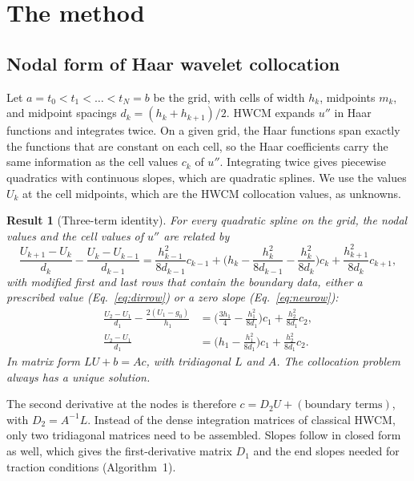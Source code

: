 \documentclass[preprint,12pt]{elsarticle}
\newtheorem{result}{Result}
\theoremstyle{remark}
\begin{document}
\section{The method}\label{sec:method}
\subsection{Nodal form of Haar wavelet collocation}
Let $a=t_0<t_1<\dots<t_N=b$ be the grid, with cells of width $h_k$, midpoints $m_k$, and midpoint
spacings $d_k=(h_k+h_{k+1})/2$. HWCM expands $u''$ in Haar functions and integrates twice. On a given
grid, the Haar functions span exactly the functions that are constant on each cell, so the Haar
coefficients carry the same information as the cell values $c_k$ of $u''$. Integrating twice gives
piecewise quadratics with continuous slopes, which are quadratic splines. We use the values $U_k$ at the
cell midpoints, which are the HWCM collocation values, as unknowns.

\begin{result}[Three-term identity]\label{thm:identity}
For every quadratic spline on the grid, the nodal values and the cell values of $u''$ are related by
\begin{equation}\label{eq:interior}
\frac{U_{k+1}-U_k}{d_k}-\frac{U_k-U_{k-1}}{d_{k-1}}
=\frac{h_{k-1}^2}{8d_{k-1}}c_{k-1}+\Big(h_k-\frac{h_k^2}{8d_{k-1}}-\frac{h_k^2}{8d_k}\Big)c_k+\frac{h_{k+1}^2}{8d_k}c_{k+1},
\end{equation}
with modified first and last rows that contain the boundary data, either a prescribed value
(Eq.~\eqref{eq:dirrow}) or a zero slope (Eq.~\eqref{eq:neurow}):
\begin{align}
\frac{U_2-U_1}{d_1}-\frac{2(U_1-g_0)}{h_1}&=\Big(\frac{3h_1}{4}-\frac{h_1^2}{8d_1}\Big)c_1+\frac{h_2^2}{8d_1}c_2,\label{eq:dirrow}\\
\frac{U_2-U_1}{d_1}&=\Big(h_1-\frac{h_1^2}{8d_1}\Big)c_1+\frac{h_2^2}{8d_1}c_2.\label{eq:neurow}
\end{align}
In matrix form $LU+b=Ac$, with tridiagonal $L$ and $A$. The collocation problem always has a unique
solution.
\end{result}

The second derivative at the nodes is therefore $c=D_2U+(\text{boundary terms})$, with $D_2=A^{-1}L$.
Instead of the dense integration matrices of classical HWCM, only two tridiagonal matrices need to be
assembled. Slopes follow in closed form as well, which gives the first-derivative matrix $D_1$ and the
end slopes needed for traction conditions (Algorithm~1).
\end{document}

